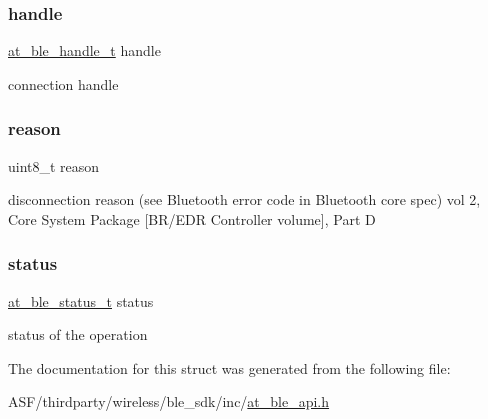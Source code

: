 \subsubsection{\texorpdfstring{handle}{handle}}
{\footnotesize\ttfamily \mbox{\hyperlink{at__ble__api_8h_abd23646d0c662860741f787efc8456f2}{at\+\_\+ble\+\_\+handle\+\_\+t}} handle}



connection handle 

\mbox{\label{structat__ble__disconnected__t_ada17c117060406a3a2871c6856dd0205}} 
\subsubsection{\texorpdfstring{reason}{reason}}
{\footnotesize\ttfamily uint8\+\_\+t reason}

disconnection reason (see Bluetooth error code in Bluetooth core spec) vol 2, Core System Package \mbox{[}B\+R/\+E\+DR Controller volume\mbox{]}, Part D \mbox{\label{structat__ble__disconnected__t_a0b48093fc2030779fc47e5216f8019e2}} 
\subsubsection{\texorpdfstring{status}{status}}
{\footnotesize\ttfamily \mbox{\hyperlink{group__error__codes__group_ga3b1db9b95feb157b3c188ca27fe76988}{at\+\_\+ble\+\_\+status\+\_\+t}} status}



status of the operation 



The documentation for this struct was generated from the following file\+:\begin{DoxyCompactItemize}
\item 
A\+S\+F/thirdparty/wireless/ble\+\_\+sdk/inc/\mbox{\hyperlink{at__ble__api_8h}{at\+\_\+ble\+\_\+api.\+h}}\end{DoxyCompactItemize}
